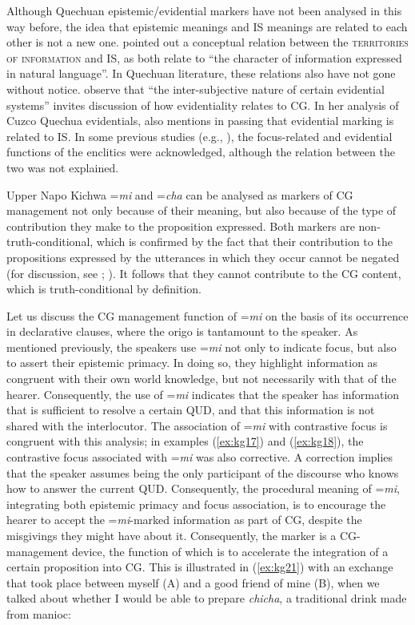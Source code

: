 \documentclass[output=paper]{langscibook}
\begin{document}
Although Quechuan epistemic/evidential markers have not been analysed in this way before, the idea that epistemic meanings and IS meanings are related to each other is not a new one. \cite[3]{Kamio1997} pointed out a conceptual relation between the \textsc{territories of information} and IS, as both relate to “the character of information expressed in natural language”. In Quechuan literature, these relations also have not gone without notice. \cite{Hintz2017} observe that “the inter-subjective nature of certain evidential systems” invites discussion of how evidentiality relates to CG. In her analysis of Cuzco Quechua evidentials, \cite{Faller2002} also mentions in passing that evidential marking is related to IS. In some previous studies (e.g., \citealt{Muysken1995}), the focus-related and evidential functions of the enclitics were acknowledged, although the relation between the two was not explained.

Upper Napo Kichwa =\textit{mi} and =\textit{cha} can be analysed as markers of CG management not only because of their meaning, but also because of the type of contribution they make to the proposition expressed. Both markers are non-truth-conditional, which is confirmed by the fact that their contribution to the propositions expressed by the utterances in which they occur cannot be negated (for discussion, see \citealt[ch.5]{Grzech2016a}; \citeyear{Grzech2016b}). It follows that they cannot contribute to the CG content, which is truth-conditional by definition.

Let us discuss the CG management function of =\textit{mi} on the basis of its occurrence in declarative clauses, where the origo is tantamount to the speaker. As mentioned previously, the speakers use =\textit{mi} not only to indicate focus, but also to assert their epistemic primacy. In doing so, they highlight information as congruent with their own world knowledge, but not necessarily with that of the hearer. Consequently, the use of =\textit{mi} indicates that the speaker has information that is sufficient to resolve a certain QUD, and that this information is not shared with the interlocutor. The association of =\textit{mi} with contrastive focus is congruent with this analysis; in examples (\ref{ex:kg17}) and (\ref{ex:kg18}), the contrastive focus associated with =\textit{mi} was also corrective. A correction implies that the speaker assumes being the only participant of the discourse who knows how to answer the current QUD. Consequently, the procedural meaning of =\textit{mi}, integrating both epistemic primacy and focus association, is to encourage the hearer to accept the =\textit{mi}-marked information as part of CG, despite the misgivings they might have about it. Consequently, the marker is a CG-management device, the function of which is to accelerate the integration of a certain proposition into CG. This is illustrated in (\ref{ex:kg21}) with an exchange that took place between myself (A) and a good friend of mine (B), when we talked about whether I would be able to prepare \textit{chicha}, a traditional drink made from manioc:
\end{document}
